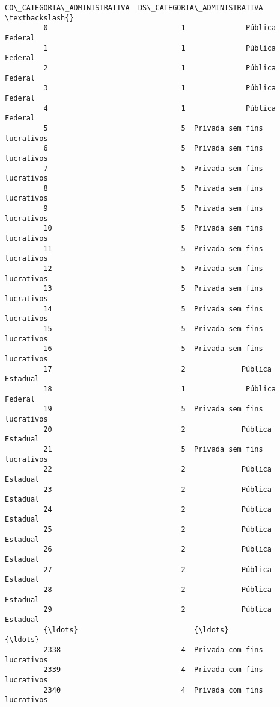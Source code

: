 \documentclass[11pt]{article}
\begin{document}
\begin{Verbatim}[commandchars=\\\{\}]
               CO\_CATEGORIA\_ADMINISTRATIVA  DS\_CATEGORIA\_ADMINISTRATIVA  \textbackslash{}
         0                               1              Pública Federal   
         1                               1              Pública Federal   
         2                               1              Pública Federal   
         3                               1              Pública Federal   
         4                               1              Pública Federal   
         5                               5  Privada sem fins lucrativos   
         6                               5  Privada sem fins lucrativos   
         7                               5  Privada sem fins lucrativos   
         8                               5  Privada sem fins lucrativos   
         9                               5  Privada sem fins lucrativos   
         10                              5  Privada sem fins lucrativos   
         11                              5  Privada sem fins lucrativos   
         12                              5  Privada sem fins lucrativos   
         13                              5  Privada sem fins lucrativos   
         14                              5  Privada sem fins lucrativos   
         15                              5  Privada sem fins lucrativos   
         16                              5  Privada sem fins lucrativos   
         17                              2             Pública Estadual   
         18                              1              Pública Federal   
         19                              5  Privada sem fins lucrativos   
         20                              2             Pública Estadual   
         21                              5  Privada sem fins lucrativos   
         22                              2             Pública Estadual   
         23                              2             Pública Estadual   
         24                              2             Pública Estadual   
         25                              2             Pública Estadual   
         26                              2             Pública Estadual   
         27                              2             Pública Estadual   
         28                              2             Pública Estadual   
         29                              2             Pública Estadual   
         {\ldots}                           {\ldots}                          {\ldots}   
         2338                            4  Privada com fins lucrativos   
         2339                            4  Privada com fins lucrativos   
         2340                            4  Privada com fins lucrativos   

\end{Verbatim}
\end{document}
